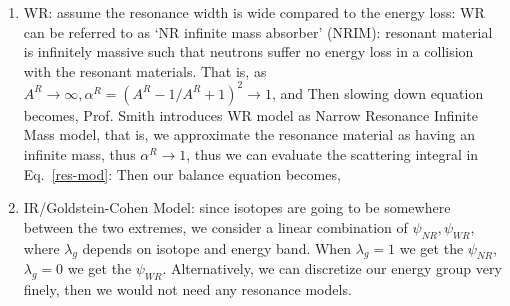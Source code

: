 \documentclass{school-22.211-notes}
\begin{document}
\begin{enumerate}
\item WR: assume the resonance width is wide compared to the energy loss: 
  WR can be referred to as `NR infinite mass absorber' (NRIM): resonant material is infinitely massive such that neutrons suffer no energy loss in a collision with the resonant materials. That is, as $A^R \to \infty, \alpha^R = (A^R - 1/A^R + 1)^2 \to 1$, and 
  Then slowing down equation becomes, 
  Prof. Smith introduces WR model as Narrow Resonance Infinite Mass model, that is, we approximate the resonance material as having an infinite mass, thus $\alpha^R \to 1$, thus we can evaluate the scattering integral in Eq.~\ref{res-mod}: 
Then our balance equation becomes, 

\item IR/Goldstein-Cohen Model: since isotopes are going to be somewhere between the two extremes, we consider a linear combination of $\psi_{NR}, \psi_{WR}$, 
where $\lambda_g$ depends on isotope and energy band. When $\lambda_g = 1$ we get the $\psi_{NR}$, $\lambda_g = 0$ we get the $\psi_{WR}$. Alternatively, we can discretize our energy group very finely, then we would not need any resonance models.


\end{enumerate}
\end{document}
